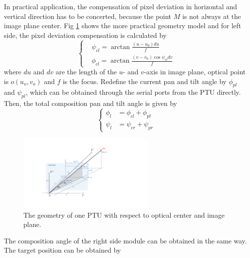 In practical application, the compensation of pixel deviation in horizontal and vertical direction has to be concerted, because the point $M$ is not always at the image plane center. Fig \ref{fig:Fig02_ImagePlaneOnly} shows the more practical geometry model and for left side, the pixel deviation compensation is calculated by
\begin{equation} 
	\left \{
	\begin{split}
		& \psi_{cl} = \arctan \frac{(u-u_0)du}{f} \\
		& \phi_{cl} = \arctan \frac{(v-v_0)\cos\psi_{cl}dv}{f} 
	\end{split}
	\right.
\end{equation}
where $du$ and $dv$ are the length of the $u$- and $v$-axis in image plane, optical point is $o(u_o,v_o)$ and $f$ is the focus. Redefine the current pan and tilt angle by $\phi_{pl}$ and $\psi_{pl}$, which can be obtained through the serial ports from the PTU directly. Then, the total composition pan and tilt angle is given by
\begin{equation} 
	\left \{
	\begin{split}
		\phi_l &= \phi_{cl} + \phi_{pl} \\ 
		\psi_l &= \psi_{cr} + \psi_{pr}
	\end{split}
	\right.
\end{equation}

\begin{figure}[!th]
	\centering
	\includegraphics[width=0.6\textwidth]{Figs/chp03_vision_02_image_plane.pdf}
	\caption{The geometry of one PTU with respect to optical center and image plane.}
	\label{fig:Fig02_ImagePlaneOnly}
\end{figure}

The composition angle of the right side module can be obtained in the same way. The target position can be obtained by

